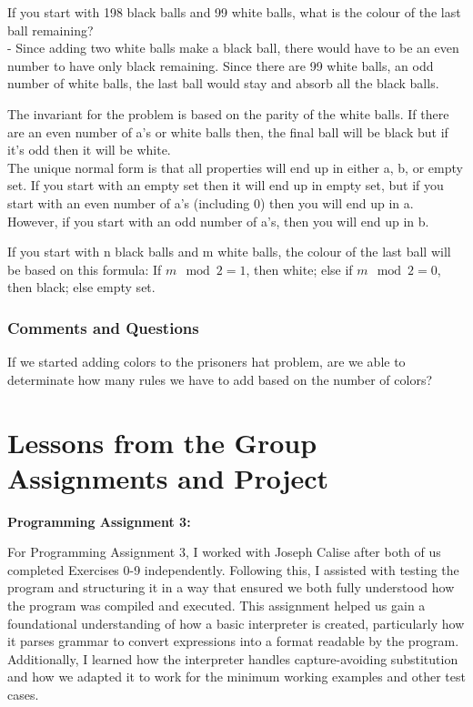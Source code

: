 \documentclass{article}
\theoremstyle{theorem}
\theoremstyle{definition}
\theoremstyle{remark}
\begin{document}
If you start with 198 black balls and 99 white balls, what is the colour of the last ball remaining? \\
- Since adding two white balls make a black ball, there would have to be an even number to have only black remaining. Since there are 99 white balls, an odd number of white balls, the last ball would stay and absorb all the black balls. 

The invariant for the problem is based on the parity of the white balls. If there are an even number of a's or white balls then, the final ball will be black but if it's odd then it will be white. \\
The unique normal form is that all properties will end up in either a, b, or empty set. If you start with an empty set then it will end up in empty set, but if you start with an even number of a's (including 0) then you will end up in a. However, if you start with an odd number of a's, then you will end up in b. 

If you start with n black balls and m white balls, the colour of the last ball will be based on this formula:
If \( m \mod 2 = 1 \), then white; else if \( m \mod 2 = 0 \), then black; else empty set.


\subsubsection{Comments and Questions}

If we started adding colors to the prisoners hat problem, are we able to determinate how many rules we have to add based on the number of colors?

\section{Lessons from the Group Assignments and Project}

\textbf{Programming Assignment 3:}

For Programming Assignment 3, I worked with Joseph Calise after both of us completed Exercises 0-9 
independently. Following this, I assisted with testing the program and structuring it in a way that 
ensured we both fully understood how the program was compiled and executed. This assignment helped us 
gain a foundational understanding of how a basic interpreter is created, particularly how it parses 
grammar to convert expressions into a format readable by the program. Additionally, I learned how the 
interpreter handles capture-avoiding substitution and how we adapted it to work for the minimum working 
examples and other test cases.
\end{document}
